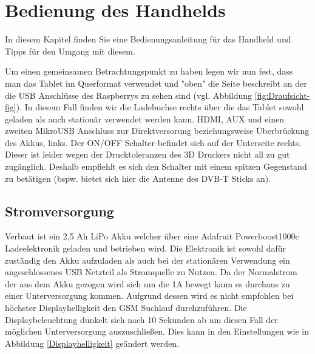 %
%

\chapter{Bedienung des Handhelds}
In diesem Kapitel finden Sie eine Bedienungsanleitung für das Handheld und Tipps für den Umgang mit diesem.

Um einen gemeinsamen Betrachtungspunkt zu haben legen wir nun fest, dass man das Tablet im Querformat verwendet und "oben" die Seite beschreibt an der die USB Anschlüsse des Raspberrys zu sehen sind (vgl. Abbildung \ref{fig:Draufsicht-fig}). In diesem Fall finden wir die Ladebuchse rechts über die das Tablet sowohl geladen als auch stationär verwendet werden kann. HDMI, AUX und einen zweiten MikroUSB Anschluss zur Direktversorung beziehungsweise Überbrückung des Akkus, links. Der ON/OFF Schalter befindet sich auf der Unterseite rechts. Dieser ist leider wegen der Drucktoleranzen des 3D Druckers nicht all zu gut zugänglich. Deshalb empfiehlt es sich den Schalter mit einem spitzen Gegenstand zu betätigen (bspw. bietet sich hier die Antenne des DVB-T Sticks an).

\newpage

\section{Stromversorgung}

Verbaut ist ein 2,5 Ah LiPo Akku welcher über eine Adafruit Powerboost1000c Ladeelektronik geladen und betrieben wird. Die Elektronik ist sowohl dafür zuständig den Akku aufzuladen als auch bei der stationären Verwendung ein angeschlossenes USB Netzteil als Stromquelle zu Nutzen. Da der Normalstrom der aus dem Akku gezogen wird sich um die 1A bewegt kann es durchaus zu einer Unterversorgung kommen. Aufgrund dessen wird es nicht empfohlen bei höchster Displayhelligkeit den \ac{GSM} Suchlauf durchzuführen. Die Displaybeleuchtung dunkelt sich nach 10 Sekunden ab um diesen Fall der möglichen Unterversorgung auszuschließen. Dies kann in den Einstellungen wie in Abbildung \ref{Displayhelligkeit} geändert werden. 


